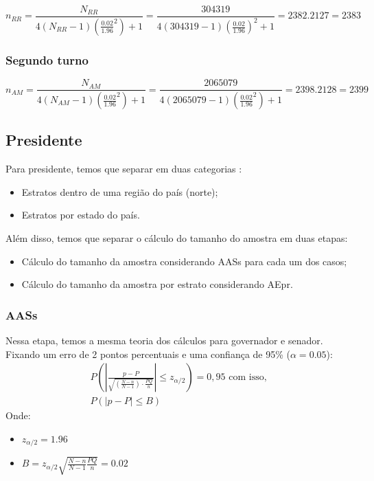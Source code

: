 \documentclass{article}
\begin{document}
\[
n_{RR} = \frac{N_{RR}}{4(N_{RR}-1)(\frac{0.02}{1.96}^2) + 1 } = \frac{304319}{4(304319-1)(\frac{0.02}{1.96})^2 + 1} = 2382.2127 = 2383
\]

\subsubsection*{Segundo turno}

\[
n_{AM} = \frac{N_{AM}}{4(N_{AM}-1)(\frac{0.02}{1.96}^2) + 1 } = \frac{2065079}{4(2065079 - 1) (\frac{0.02}{1.96}^2) + 1} = 2398.2128 = 2399
\]

\subsection*{Presidente}
Para presidente, temos que separar em duas categorias : 
\begin{itemize}
    \item Estratos dentro de uma região do país (norte);
    \item Estratos por estado do país.
\end{itemize}

Além disso, temos que separar o cálculo do tamanho do amostra em duas etapas:
\begin{itemize}
    \item Cálculo do tamanho da amostra considerando AASs para cada um dos casos;
    \item Cálculo do tamanho da amostra por estrato considerando AEpr.
\end{itemize}

\subsubsection*{AASs} 
Nessa etapa, temos a mesma teoria dos cálculos para governador e senador. Fixando um erro de 2 pontos percentuais e uma confiança de 95\% ($\alpha = 0.05$):
\[
\begin{array}{l}
P\left( \left| \frac{p - P}{\sqrt{ \left( \frac{N - n}{N - 1} \right) \cdot \frac{PQ}{n} }} \right| \leq z_{\alpha/2} \right) = 0{,}95 \text{ com isso,}\\ 
P\left( \left| p - P \right| \leq B \right)
\end{array}
\]
Onde:
\begin{itemize}
    \item $z_{\alpha/2} = 1.96$
    \item $B = z_{\alpha/2}\sqrt{\frac{N-n}{N-1}\frac{PQ}{n}} = 0.02$
\end{itemize}
\end{document}
